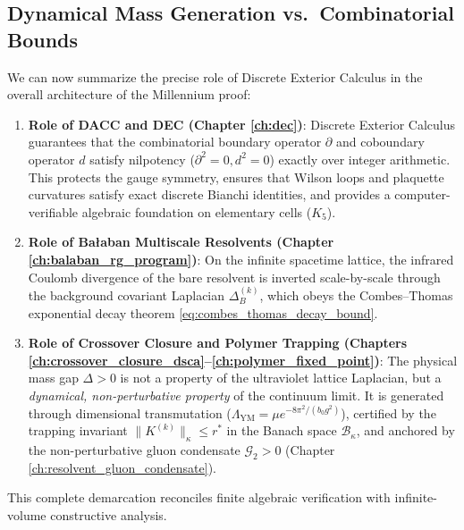 \subsection{Dynamical Mass Generation vs.\ Combinatorial Bounds}
\label{subsec:dynamical_vs_combinatorial}

We can now summarize the precise role of Discrete Exterior Calculus in the overall architecture of the Millennium proof:
\begin{enumerate}
    \item \textbf{Role of DACC and DEC (Chapter \ref{ch:dec})}: Discrete Exterior Calculus guarantees that the combinatorial boundary operator $\partial$ and coboundary operator $d$ satisfy nilpotency ($\partial^2 = 0, d^2 = 0$) exactly over integer arithmetic. This protects the gauge symmetry, ensures that Wilson loops and plaquette curvatures satisfy exact discrete Bianchi identities, and provides a computer-verifiable algebraic foundation on elementary cells ($K_5$).
    
    \item \textbf{Role of Ba\l aban Multiscale Resolvents (Chapter \ref{ch:balaban_rg_program})}: On the infinite spacetime lattice, the infrared Coulomb divergence of the bare resolvent is inverted scale-by-scale through the background covariant Laplacian $\Delta_B^{(k)}$, which obeys the Combes--Thomas exponential decay theorem \eqref{eq:combes_thomas_decay_bound}.
    
    \item \textbf{Role of Crossover Closure and Polymer Trapping (Chapters \ref{ch:crossover_closure_dsca}--\ref{ch:polymer_fixed_point})}: The physical mass gap $\Delta > 0$ is not a property of the ultraviolet lattice Laplacian, but a \emph{dynamical, non-perturbative property} of the continuum limit. It is generated through dimensional transmutation ($\Lambda_{\mathrm{YM}} = \mu e^{-8\pi^2/(b_0 g^2)}$), certified by the trapping invariant $\|K^{(k)}\|_\kappa \le r^*$ in the Banach space $\mathcal{B}_\kappa$, and anchored by the non-perturbative gluon condensate $\mathcal{G}_2 > 0$ (Chapter \ref{ch:resolvent_gluon_condensate}).
\end{enumerate}
This complete demarcation reconciles finite algebraic verification with infinite-volume constructive analysis.
